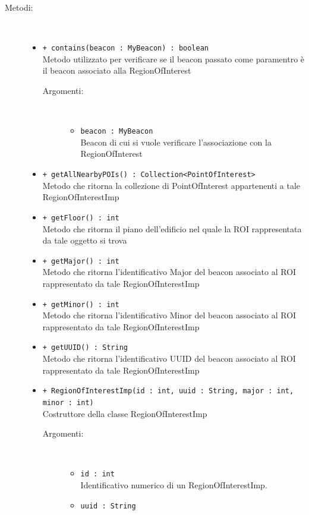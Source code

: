 \documentclass[../DefinizioneDiProdotto.tex]{subfiles}
\begin{document}
\begin{description}
\begin{itemize}
\end{itemize}
\item[Metodi:] \
\begin{itemize}
\item \texttt{+ contains(beacon : MyBeacon) : boolean}\\
Metodo utilizzato per verificare se il beacon passato come paramentro è il beacon associato alla RegionOfInterest
 \begin{description}
\item[Argomenti:] \
\begin{itemize}
\item \texttt{beacon : MyBeacon}\\
Beacon di cui si vuole verificare l'associazione con la RegionOfInterest\end{itemize}
\end{description}
\item \texttt{+ getAllNearbyPOIs() : Collection<PointOfInterest>}\\
Metodo che ritorna la collezione di PointOfInterest appartenenti a tale RegionOfInterestImp
 \item \texttt{+ getFloor() : int}\\
Metodo che ritorna il piano dell'edificio nel quale la ROI rappresentata da tale oggetto si trova
 \item \texttt{+ getMajor() : int}\\
Metodo che ritorna l'identificativo Major del beacon associato al ROI rappresentato da tale RegionOfInterestImp
 \item \texttt{+ getMinor() : int}\\
Metodo che ritorna l'identificativo Minor del beacon associato al ROI rappresentato da tale RegionOfInterestImp
 \item \texttt{+ getUUID() : String}\\
Metodo che ritorna l'identificativo UUID del beacon associato al ROI rappresentato da tale RegionOfInterestImp
 \item \texttt{+ RegionOfInterestImp(id  : int, uuid : String, major : int, minor : int)}\\
Costruttore della classe RegionOfInterestImp
 \begin{description}
\item[Argomenti:] \
\begin{itemize}
\item \texttt{id  : int}\\
Identificativo numerico di un RegionOfInterestImp.\item \texttt{uuid : String}\\

\end{itemize}
\end{description}
\end{itemize}
\end{description}
\end{document}
